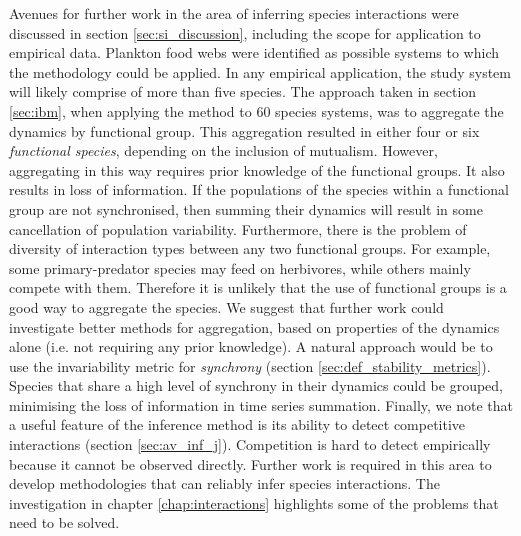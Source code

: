Avenues for further work in the area of inferring species interactions were discussed in section \ref{sec:si_discussion}, including the scope for application to empirical data. Plankton food webs were identified as possible systems to which the methodology could be applied. In any empirical application, the study system will likely comprise of more than five species. The approach taken in section \ref{sec:ibm}, when applying the method to 60 species systems, was to aggregate the dynamics by functional group. This aggregation resulted in either four or six \emph{functional species}, depending on the inclusion of mutualism. However, aggregating in this way requires prior knowledge of the functional groups. It also results in loss of information. If the populations of the species within a functional group are not synchronised, then summing their dynamics will result in some cancellation of population variability. Furthermore, there is the problem of diversity of interaction types between any two functional groups. For example, some primary-predator species may feed on herbivores, while others mainly compete with them. Therefore it is unlikely that the use of functional groups is a good way to aggregate the species. We suggest that further work could investigate better methods for aggregation, based on properties of the dynamics alone (i.e. not requiring any prior knowledge). A natural approach would be to use the invariability metric for \emph{synchrony} (section \ref{sec:def_stability_metrics}). Species that share a high level of synchrony in their dynamics could be grouped, minimising the loss of information in time series summation. Finally, we note that a useful feature of the inference method is its ability to detect competitive interactions (section \ref{sec:av_inf_j}). Competition is hard to detect empirically because it cannot be observed directly. Further work is required in this area to develop methodologies that can reliably infer species interactions. The investigation in chapter \ref{chap:interactions} highlights some of the problems that need to be solved. 

